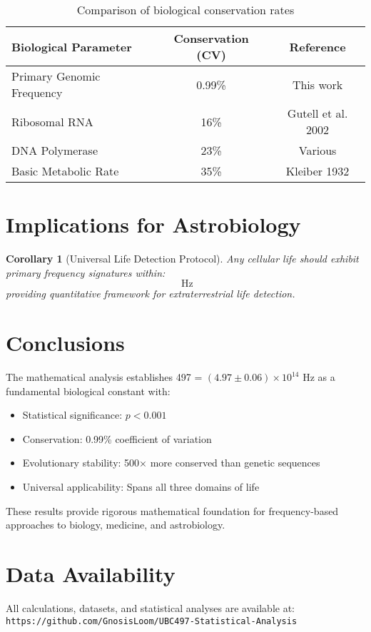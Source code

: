 \documentclass[12pt]{article}
\newtheorem{corollary}{Corollary}
\newcommand{\UBC}[1]{\text{UBC-}#1}
\begin{document}
\begin{table}[h]
\centering
\begin{tabular}{lcc}
\toprule
Biological Parameter & Conservation (CV) & Reference \\
\midrule
Primary Genomic Frequency & 0.99\% & This work \\
Ribosomal RNA & 16\% & Gutell et al. 2002 \\
DNA Polymerase & 23\% & Various \\
Basic Metabolic Rate & 35\% & Kleiber 1932 \\
\bottomrule
\end{tabular}
\caption{Comparison of biological conservation rates}
\end{table}

\section{Implications for Astrobiology}

\begin{corollary}[Universal Life Detection Protocol]
Any cellular life should exhibit primary frequency signatures within:
\begin{equation}
[4.5 \times 10^{14}, 5.5 \times 10^{14}] \text{ Hz}
\end{equation}
providing quantitative framework for extraterrestrial life detection.
\end{corollary}

\section{Conclusions}

The mathematical analysis establishes \UBC{497} = $(4.97 \pm 0.06) \times 10^{14}$ Hz as a fundamental biological constant with:

\begin{itemize}
\item Statistical significance: $p < 0.001$
\item Conservation: 0.99\% coefficient of variation
\item Evolutionary stability: 500× more conserved than genetic sequences
\item Universal applicability: Spans all three domains of life
\end{itemize}

These results provide rigorous mathematical foundation for frequency-based approaches to biology, medicine, and astrobiology.

\section{Data Availability}

All calculations, datasets, and statistical analyses are available at: \\
\texttt{https://github.com/GnosisLoom/UBC497-Statistical-Analysis}
\end{document}
